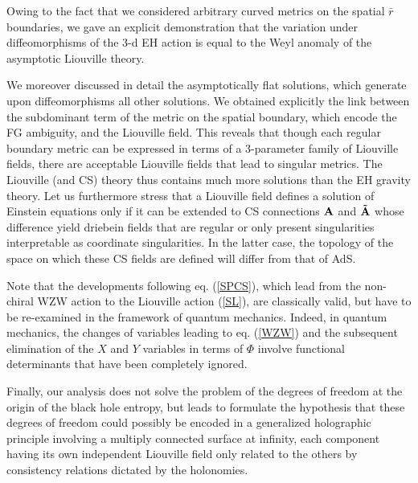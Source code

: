 \documentclass[a4paper,10pt]{article}
\begin{document}
Owing to the fact that we considered arbitrary curved metrics on the spatial 
$\bar r$ boundaries,
we gave an explicit demonstration that the variation under
diffeomorphisms of the 3-d EH action is equal to the Weyl anomaly of the 
asymptotic Liouville theory.  

We moreover discussed in detail the asymptotically flat solutions, which
generate upon diffeomorphisms all other solutions. We obtained explicitly 
the link between the subdominant term of the metric on the spatial boundary,
which encode the FG ambiguity, and the Liouville field. This reveals that 
though each regular  boundary metric can be expressed in terms of 
a 3-parameter family of Liouville fields, there are
acceptable Liouville fields that lead to singular metrics.
The Liouville (and CS) theory thus contains much more solutions than the
EH gravity theory. 
Let us furthermore stress that a Liouville field defines a solution of
Einstein equations only if it can be extended to CS connections $\bf A$
and $\bf \tilde A$ whose difference yield driebein fields that are regular
or only present singularities interpretable as coordinate singularities. 
In the latter case, 
the topology of the space on which these CS fields are defined 
will differ from that of AdS.

Note that the developments following eq. (\ref{SPCS}), which lead from
the non-chiral WZW action to the Liouville action (\ref{SL}), 
are classically 
valid, but have to be re-examined in the framework of quantum mechanics.
Indeed, in quantum mechanics, the changes of variables leading to 
eq. (\ref{WZW}) and the subsequent elimination of the $X$ and $Y$ 
variables in terms of $\Phi$
involve functional determinants that have been completely ignored.

Finally, our analysis does not solve the problem 
of the degrees of freedom at the origin 
of the black hole entropy, but leads to formulate the hypothesis 
that these degrees of freedom could possibly be encoded in a generalized
holographic principle involving a multiply connected surface at infinity,
each component having its own independent Liouville field only related
to the others by consistency relations dictated by the holonomies.

\vspace*{0.25cm} 
\end{document}
